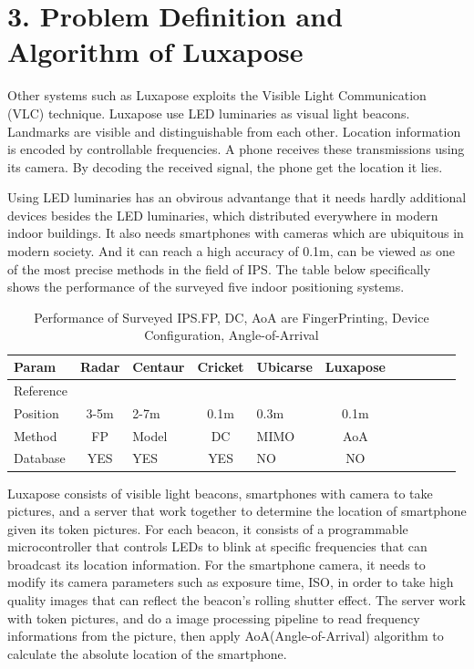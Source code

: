 \documentclass[a4paper, 11pt]{article} %
\begin{document}

\section*{3. Problem Definition and Algorithm of Luxapose}
Other systems such as Luxapose exploits the Visible Light Communication (VLC) technique. Luxapose use LED luminaries as visual light beacons. Landmarks are visible and distinguishable from each other. Location information is encoded by controllable frequencies. A phone receives these transmissions using its camera. By decoding the received signal, the phone get the location it lies.

Using LED luminaries has an obvirous advantange that it needs hardly additional devices besides the LED luminaries, which distributed everywhere in modern indoor buildings. It also needs smartphones with cameras which are ubiquitous in modern society. And it can reach a high accuracy of 0.1m, can be viewed as one of the most precise methods in the field of IPS. The table below specifically shows the performance of the surveyed five indoor positioning systems.

\begin{table}[htbp]	
	\centering 
	\begin{tabular}{lclclclclcl}
		\toprule
		Param & Radar & Centaur & Cricket & Ubicarse & Luxapose \\
		\midrule
		Reference & \cite{Radar00} & \cite{Centaur12} & \cite{Cricket04} & \cite{Ubicarse14} & \cite{Luxapose14}\\
		Position & 3-5m & 2-7m & 0.1m & 0.3m & 0.1m\\
		Method & FP & Model & DC & MIMO & AoA\\
		Database & YES & YES & YES & NO & NO\\
		\bottomrule
	\end{tabular}
	\caption{\label{tab:test}Performance of Surveyed IPS.FP, DC, AoA are FingerPrinting, Device Configuration, Angle-of-Arrival}
\end{table}


Luxapose consists of visible light beacons, smartphones with camera to take pictures, and a server that work together to determine the location of smartphone given its token pictures. For each beacon, it consists of a programmable microcontroller that controls LEDs to blink at specific frequencies that can broadcast its location information. For the smartphone camera, it needs to modify its camera parameters such as exposure time, ISO, in order to take high quality images that can reflect the beacon's rolling shutter effect. The server work with token pictures, and do a image processing pipeline to read frequency informations from the picture, then apply AoA(Angle-of-Arrival) algorithm to calculate the absolute location of the smartphone.
\end{document}
